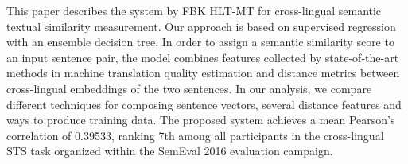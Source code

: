 This paper describes the system by FBK HLT-MT for cross-lingual semantic textual similarity measurement. Our approach is based on supervised regression with an ensemble decision tree. In order to assign a semantic similarity score to an input sentence pair, the model combines features collected by state-of-the-art methods in machine translation quality estimation and distance metrics between cross-lingual embeddings of the two sentences. In our analysis, we compare different techniques for composing sentence vectors, several distance features and ways to produce training data. The proposed system achieves a mean Pearson's correlation of 0.39533, ranking 7th among all participants in the cross-lingual STS task organized within the SemEval 2016 evaluation campaign.
